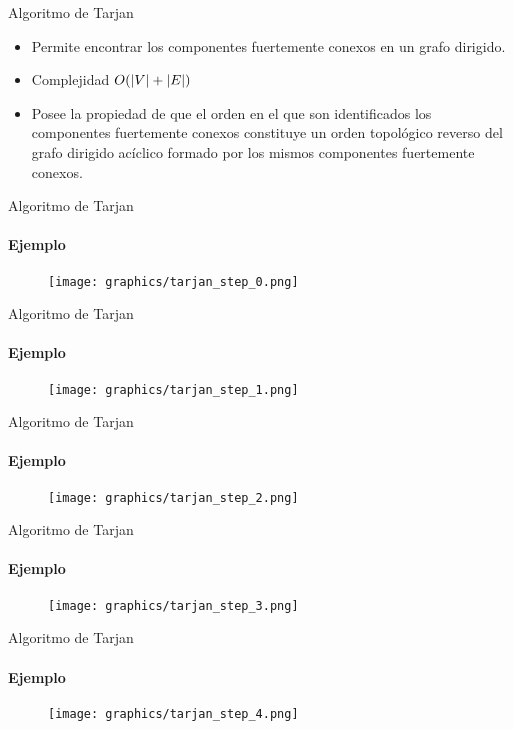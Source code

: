 \begin{frame}{Algoritmo de Tarjan}
    \begin{itemize}
        \item<1-> Permite encontrar los componentes fuertemente conexos en un grafo dirigido.
        \item<2-> Complejidad $O(\lvert V\rvert+\lvert E\rvert)$
        \item<3-> Posee la propiedad de que el orden en el que son identificados los componentes fuertemente conexos constituye un orden topológico reverso del grafo dirigido acíclico formado por los mismos componentes fuertemente conexos.
    \end{itemize}
\end{frame}

\begin{frame}{Algoritmo de Tarjan}
    \framesubtitle{Ejemplo}
    \begin{figure}
        \texttt{[image: graphics/tarjan\_step\_0.png]}
    \end{figure}
\end{frame}

\begin{frame}{Algoritmo de Tarjan}
    \framesubtitle{Ejemplo}
    \begin{figure}
        \texttt{[image: graphics/tarjan\_step\_1.png]}
    \end{figure}
\end{frame}

\begin{frame}{Algoritmo de Tarjan}
    \framesubtitle{Ejemplo}
    \begin{figure}
        \texttt{[image: graphics/tarjan\_step\_2.png]}
    \end{figure}
\end{frame}

\begin{frame}{Algoritmo de Tarjan}
    \framesubtitle{Ejemplo}
    \begin{figure}
        \texttt{[image: graphics/tarjan\_step\_3.png]}
    \end{figure}
\end{frame}

\begin{frame}{Algoritmo de Tarjan}
    \framesubtitle{Ejemplo}
    \begin{figure}
        \texttt{[image: graphics/tarjan\_step\_4.png]}
    \end{figure}
\end{frame}


